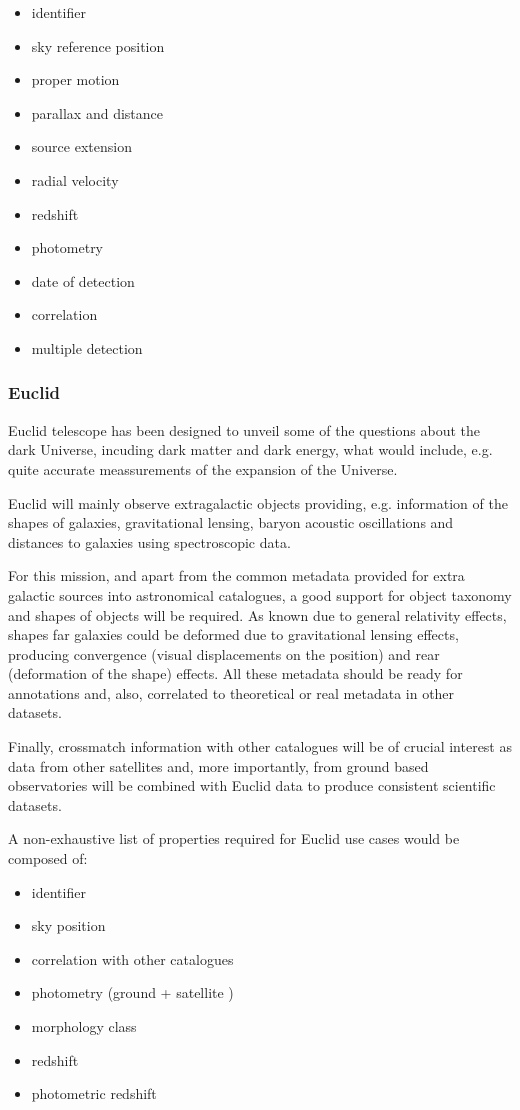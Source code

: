 \documentclass[11pt,a4paper]{ivoa}
\begin{document}
\begin{itemize}
    \item identifier
    \item sky reference position
    \item proper motion
    \item parallax and distance

    \item source extension
    \item radial velocity
    \item redshift
    \item photometry
    \item date of detection
    \item correlation
    \item multiple detection
\end{itemize}


\subsubsection{Euclid}
Euclid telescope has been designed to unveil some of the questions about the
dark Universe, incuding dark matter and dark energy, what would include, e.g.
quite accurate meassurements of the expansion of the Universe.

Euclid will mainly observe extragalactic objects providing, e.g. information
of the shapes of galaxies, gravitational lensing,  baryon acoustic oscillations
and distances to galaxies using spectroscopic data.

For this mission, and apart from the common metadata provided for extra galactic
sources into astronomical catalogues, a good support for object taxonomy and
shapes of objects will be required. As known due to general relativity effects,
shapes far galaxies could be deformed due to gravitational lensing effects, 
producing convergence (visual displacements on the position) and rear (deformation
of the shape) effects. All these metadata should be ready for annotations and, 
also, correlated to theoretical or real metadata in other datasets.

Finally, crossmatch information with other catalogues will be of crucial interest
as data from other satellites and, more importantly, from ground based
observatories will be combined with Euclid data to produce consistent scientific
datasets.

A non-exhaustive list of properties required for Euclid use cases would be composed
of:
\begin{itemize}
    \item identifier
    \item sky position
    \item correlation with other catalogues
    \item photometry (ground + satellite )
    \item morphology class
    \item redshift
    \item photometric redshift
\end{itemize}
\end{document}

